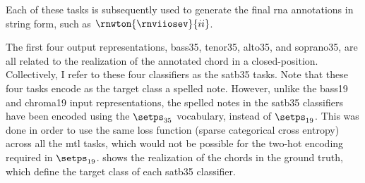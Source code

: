 Each of these tasks is subsequently used to generate the
final \gls{rna} annotations in string form, such as
$\rnwton{\rnviiosev}{ii}$.

The first four output representations, \gls{bass35},
\gls{tenor35}, \gls{alto35}, and \gls{soprano35}, are all
related to the realization of the annotated chord in a
\gls{closed-position}. Collectively, I refer to these four
classifiers as the \gls{satb35} tasks. Note that these four
tasks encode as the target class a spelled note. However,
unlike the \gls{bass19} and \gls{chroma19} input
representations, the spelled notes in the \gls{satb35}
classifiers have been encoded using the $\setps_{35}$
vocabulary, instead of $\setps_{19}$. This was done in order
to use the same loss function (sparse categorical cross
entropy) across all the \gls{mtl} tasks, which would not be
possible for the two-hot encoding required in $\setps_{19}$.
 shows the realization of the chords in the
ground truth, which define the target class of each
\gls{satb35} classifier.


